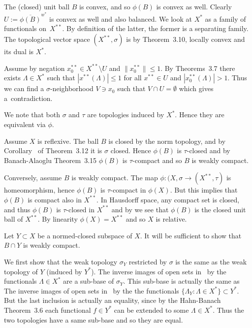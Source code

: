 \begin{enumerate}
\begin{itemize}
The (closed) unit ball $B$ is convex, and so  \(\phi(B)\) 
is convex as well.
Clearly \(U := \overline{\phi(B)}^{w^*}\) is convex as well
and also balanced.
We look at \(X^*\) as a family of functionals on~\(X^{**}\).
By definition of the latter, the former is a separating family.
The topological vector space
\((X^{**},\sigma)\) is 
by Theorem~3.10,
locally convex and its dual is \(X^*\).

Assume by negation \(x_0^{**} \in X^{**}\setminus U\) 
and \(\|x_0^{**}\| \leq 1\).
By Theorems~3.7 there exists \(\Lambda \in X^*\)
such that 
  \(|x^{**}(\Lambda)| \leq 1\) for all \(x^{**} \in U\) and
  \(|x_0^{**}(\Lambda)| > 1\).
Thus we can find a \(\sigma\)-neighborhood \(V \ni x_0\)
such that \(V \cap U = \emptyset\) which gives a~contradiction.


We note that both \(\sigma\) and \(\tau\) are 
topologies induced by \(X^*\). Hence they are equivalent via \(\phi\).

Assume $X$ is reflexive. 
The ball $B$ is closed by the norm topology,
and by Corollary~ of Theorem~3.12 it is \(\sigma\) closed.
Hence \(\phi(B)\) is \(\tau\)-closed and 
by Banach-Alaoglu Theorem~3.15 \(\phi(B)\) is \(\tau\)-compact
and so $B$ is weakly compact.

Conversely, assume $B$ is weakly compact.
The map \(\phi: (X,\sigma \to (X^{**},\tau)\) is homeomorphism,
hence  \(\phi(B)\) is \(\tau\)-compact in \(\phi(X)\).
But this implies that \(\phi(B)\) is compact also in \(X^{**}\).
In Hausdorff space, any compact set is closed, and thus
\(\phi(B)\) is \(\tau\)-closed in \(X^{**}\) and by 
we see that \(\phi(B)\) is the closed unit ball of \(X^{**}\).
By linearity \(\phi(X) = X^{**}\) and so $X$ is relative.

Let \(Y \subset X\) be a normed-closed subspace of $X$.
It will be sufficient to show that \(B\cap Y\) is weakly compact.

We first show that the 
weak topology \(\sigma_Y\) restricted by \(\sigma\)
is the same as the
weak topology of $Y$ (induced by \(Y^*\)).
The inverse images of open sets in \C\ by the functionals \(\Lambda \in X^*\)
are a  sub-base of \(\sigma_Y\). This sub-base is actually the
same as 
The inverse images of open sets in \C\ by the 
the functionals \(\{\Lambda_Y: \Lambda \in X^*\} \subset Y^*\).
But the last inclusion is actually an equality,
since by the Hahn-Banach Theorem~3.6 each functional \(f\in Y^*\)
can be extended to some \(\Lambda \in X^*\).
Thus the two topologies have a same sub-base and so they are equal.


\end{itemize}
\end{enumerate}
